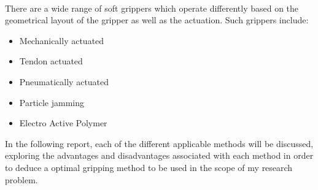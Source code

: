\documentclass[11pt]{article}
\begin{document}
\\
\newline
There are a wide range of soft grippers which operate differently based on the geometrical layout of the gripper as well as the actuation. Such grippers include:
\begin{itemize}
\item Mechanically actuated
\item Tendon actuated
\item Pneumatically actuated
\item Particle jamming
\item Electro Active Polymer  
\end{itemize}
In the following report, each of the different applicable methods will be discussed, exploring the advantages and disadvantages associated with each method in order to deduce a optimal gripping method to be used in the scope of my research problem.
\end{document}
